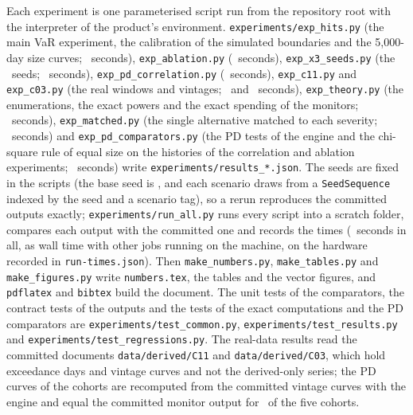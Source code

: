 Each experiment is one parameterised script run from the repository root with the interpreter of the product's environment. \texttt{experiments/exp\_hits.py} (the main VaR experiment, the calibration of the simulated boundaries and the 5,000-day size curves; \nRunHits\ seconds), \texttt{exp\_ablation.py} (\nRunAblation\ seconds), \texttt{exp\_x3\_seeds.py} (the \nSeedsCount\ seeds; \nRunSeeds\ seconds), \texttt{exp\_pd\_correlation.py} (\nRunPd\ seconds), \texttt{exp\_c11.py} and \texttt{exp\_c03.py} (the real windows and vintages; \nRunCEleven\ and \nRunCThree\ seconds),
\texttt{exp\_theory.py} (the enumerations, the exact powers and the exact spending of the monitors; \nRunTheory\ seconds), \texttt{exp\_matched.py} (the single alternative matched to each severity; \nRunMatched\ seconds) and \texttt{exp\_pd\_comparators.py} (the PD tests of the engine and the chi-square rule of equal size on the histories of the correlation and ablation experiments; \nRunPdComparators\ seconds) write \texttt{experiments/results\_*.json}. The seeds are fixed in the scripts (the base seed is \nSeed, and each scenario draws from a \texttt{SeedSequence} indexed by the seed and a scenario tag), so a rerun reproduces the committed outputs exactly; \texttt{experiments/run\_all.py} runs every script into a scratch folder, compares each output with the committed one and records the times
(\nRunTotal\ seconds in all, as wall time with other jobs running on the machine, on the hardware recorded in \texttt{run-times.json}). Then \texttt{make\_numbers.py}, \texttt{make\_tables.py} and \texttt{make\_figures.py} write \texttt{numbers.tex}, the tables and the vector figures, and \texttt{pdflatex} and \texttt{bibtex} build the document. The unit tests of the comparators, the contract tests of the outputs and the tests of the exact computations and the PD comparators are \texttt{experiments/test\_common.py}, \texttt{experiments/test\_results.py} and \texttt{experiments/test\_regressions.py}.
The real-data results read the committed documents \texttt{data/derived/C11} and \texttt{data/derived/C03}, which hold exceedance days and vintage curves and not the derived-only series; the PD curves of the cohorts are recomputed from the committed vintage curves with the engine and equal the committed monitor output for \nCThreeRebuilt\ of the five cohorts.

